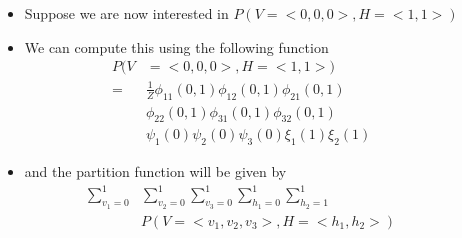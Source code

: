 \begin{frame}
\begin{columns}
\begin{overlayarea}{\textwidth}{\textheight}
\begin{center}
			\end{center}
		\end{overlayarea}
		\begin{overlayarea}{\textwidth}{\textheight}
			\begin{itemize}\justifying
				\item<1-> Suppose we are now interested in $P(V=<0,0,0>, H=<1,1>)$ 
				\item<2-> We can compute this using the following function
				\begin{align*}
				P(V&=<0,0,0>, H=<1,1>) \\
				= &\frac{1}{Z}\phi_{11}(0, 1) \phi_{12}(0,1) \phi_{21}(0,1)\\
				&\phi_{22}(0,1)\phi_{31}(0,1)\phi_{32}(0,1)\\
				&\psi_1(0) \psi_2(0) \psi_3(0)  \xi_1(1) \xi_2(1) 
				\end{align*}
				\item<3-> and the partition function will be given by
				\begin{align*}
					\sum_{v_1 = 0}^1 & \sum_{v_2 = 0}^1 \sum_{v_3 = 0}^1\sum_{h_1 = 0}^1 \sum_{h_2 = 1}^1  \\
					&P(V=<v_1,v_2,v_3>, H=<h_1,h_2>) 
				\end{align*}
			\end{itemize}
		\end{overlayarea}
	\end{columns}
\end{frame}


